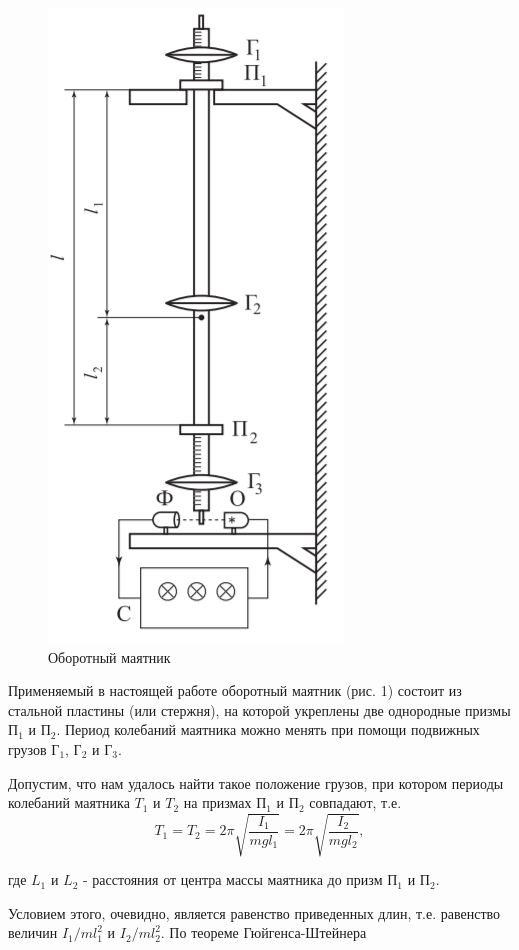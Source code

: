 \documentclass[12pt,a4paper]{article}
\begin{document}
\begin{figure}[h!]
\centering
\includegraphics[scale=1]{Image1.png}
\caption{Оборотный маятник}
\label{fig:Image1}
\end{figure}

Применяемый в настоящей работе оборотный маятник (рис. 1) состоит из стальной пластины (или стержня), на которой укреплены две однородные призмы П$_1$ и П$_2$. Период колебаний маятника можно менять при помощи подвижных грузов Г$_1$, Г$_2$ и Г$_3$.

Допустим, что нам удалось найти такое положение грузов, при котором периоды колебаний маятника $T_1$ и $T_2$ на призмах П$_1$ и П$_2$ совпадают, т.е.
\begin{equation}\label{5}
    T_1 = T_2 = 2\pi\sqrt{\frac{I_1}{mgl_1}} = 2\pi\sqrt{\frac{I_2}{mgl_2}},
\end{equation}

где $L_1$ и $L_2$ - расстояния от центра массы маятника до призм П$_1$ и П$_2$.

Условием этого, очевидно, является равенство приведенных длин, т.е. равенство величин $I_1/ml_1^2$ и $I_2/ml_2^2$. По теореме Гюйгенса-Штейнера
\end{document}
